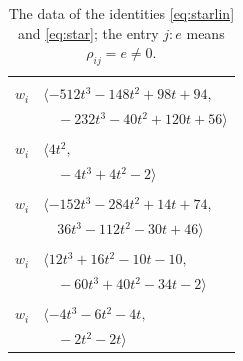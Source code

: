 \documentclass[11pt]{article}
\begin{document}
\begin{longtable}{@{}ll@{}}
\caption{The data of the identities \eqref{eq:starlin} and \eqref{eq:star}; the entry $j{:}e$ means $\rho_{ij}=e\neq0$.}\label{tab:star}\\
\hline\endfirsthead\hline\endhead\hline\endfoot
\multicolumn{2}{@{}p{0.97\textwidth}@{}}{$i=0$, $D_i=32$, $\rho_{ij}$: $8{:}1, \allowbreak 11{:}1, \allowbreak 12{:}1, \allowbreak 13{:}1, \allowbreak 14{:}1, \allowbreak 15{:}1, \allowbreak 16{:}2, \allowbreak 18{:}1, \allowbreak 26{:}2, \allowbreak 42{:}2, \allowbreak 47{:}2, \allowbreak 51{:}2, \allowbreak 54{:}1, \allowbreak 55{:}2, \allowbreak 59{:}2$}\\
$w_i$ & $\langle -512t^{3}-148t^{2}+98t+94,$\\
 & $\quad -232t^{3}-40t^{2}+120t+56\rangle$\\
\addlinespace[2pt]
\multicolumn{2}{@{}p{0.97\textwidth}@{}}{$i=1$, $D_i=1$, $\rho_{ij}$: $9{:}1, \allowbreak 21{:}2, \allowbreak 46{:}2$}\\
$w_i$ & $\langle 4t^{2},$\\
 & $\quad -4t^{3}+4t^{2}-2\rangle$\\
\addlinespace[2pt]
\multicolumn{2}{@{}p{0.97\textwidth}@{}}{$i=2$, $D_i=16$, $\rho_{ij}$: $4{:}2, \allowbreak 5{:}2, \allowbreak 21{:}2, \allowbreak 22{:}1, \allowbreak 24{:}1, \allowbreak 26{:}2, \allowbreak 28{:}2, \allowbreak 31{:}1, \allowbreak 36{:}2, \allowbreak 39{:}2, \allowbreak 40{:}2, \allowbreak 41{:}1, \allowbreak 46{:}2, \allowbreak 54{:}2, \allowbreak 56{:}2$}\\
$w_i$ & $\langle -152t^{3}-284t^{2}+14t+74,$\\
 & $\quad 36t^{3}-112t^{2}-30t+46\rangle$\\
\addlinespace[2pt]
\multicolumn{2}{@{}p{0.97\textwidth}@{}}{$i=3$, $D_i=4$, $\rho_{ij}$: $7{:}2, \allowbreak 8{:}1, \allowbreak 9{:}2, \allowbreak 31{:}2, \allowbreak 39{:}1, \allowbreak 43{:}2, \allowbreak 45{:}2, \allowbreak 46{:}2, \allowbreak 50{:}1, \allowbreak 53{:}2$}\\
$w_i$ & $\langle 12t^{3}+16t^{2}-10t-10,$\\
 & $\quad -60t^{3}+40t^{2}-34t-2\rangle$\\
\addlinespace[2pt]
\multicolumn{2}{@{}p{0.97\textwidth}@{}}{$i=4$, $D_i=2$, $\rho_{ij}$: $2{:}1, \allowbreak 21{:}2, \allowbreak 37{:}1, \allowbreak 39{:}1, \allowbreak 45{:}1, \allowbreak 54{:}1$}\\
$w_i$ & $\langle -4t^{3}-6t^{2}-4t,$\\
 & $\quad -2t^{2}-2t\rangle$\\

\end{longtable}
\end{document}
